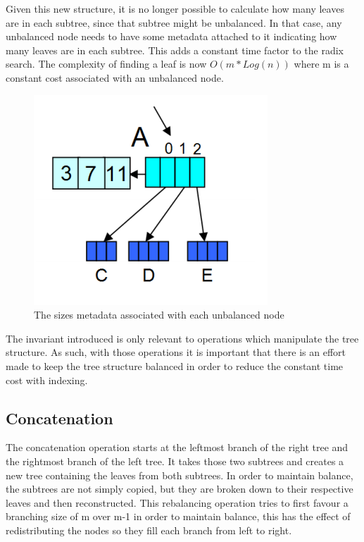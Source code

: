 \documentclass[11pt,a4paper,oneside]{article}
\begin{document}
Given this new structure, it is no longer possible to calculate how many leaves are in each subtree, since that subtree might be unbalanced. In that case, any unbalanced node needs to have some metadata attached to it indicating how many leaves are in each subtree. This adds a constant time factor to the radix search. The complexity of finding a leaf is now $O(m * Log(n))$ where m is a constant cost associated with an unbalanced node. 

\begin{figure}[h]
	\centering
	\includegraphics[scale=0.5]{img/sizesmetadata.png}
	\caption{The sizes metadata associated with each unbalanced node\citep{bagwell2011rrb}}
\end{figure}

The invariant introduced is only relevant to operations which manipulate the tree structure. As such, with those operations it is important that there is an effort made to keep the tree structure balanced in order to reduce the constant time cost with indexing.

\subsection{Concatenation}

The concatenation operation starts at the leftmost branch of the right tree and the rightmost branch of the left tree. It takes those two subtrees and creates a new tree containing the leaves from both subtrees. In order to maintain balance, the subtrees are not simply copied, but they are broken down to their respective leaves and then reconstructed. This rebalancing operation tries to first favour a branching size of m over m-1 in order to maintain balance, this has the effect of redistributing the nodes so they fill each branch from left to right.
\end{document}
